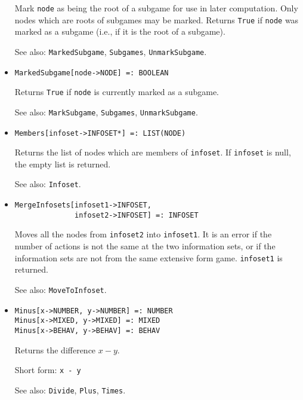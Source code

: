 \begin{itemize}
\bd
Mark \verb+node+ as being the root of a subgame for use in later computation.
Only nodes which are roots of subgames may be marked.  Returns \verb+True+
if \verb+node+ was marked as a subgame (i.e., if it is the root of a subgame).
\item [See also:] \verb+MarkedSubgame+, \verb+Subgames+,
\verb+UnmarkSubgame+.
\ed


\item{}
\protect \large \begin{verbatim}
MarkedSubgame[node->NODE] =: BOOLEAN 
\end{verbatim} \normalsize

\bd
Returns \verb+True+ if \verb+node+ is currently marked as a subgame. 
\item [See also:] \verb+MarkSubgame+, \verb+Subgames+, \verb+UnmarkSubgame+.
\ed


\item{}
\protect \large \begin{verbatim}
Members[infoset->INFOSET*] =: LIST(NODE) 
\end{verbatim}\normalsize

\bd
Returns the list of nodes which are members of \verb+infoset+.  If
\verb+infoset+ is null, the empty list is returned.
\item [See also:] \verb+Infoset+.
\ed

\item{}
\protect \large \begin{verbatim}
MergeInfosets[infoset1->INFOSET,
              infoset2->INFOSET] =: INFOSET
\end{verbatim}\normalsize

\bd
Moves all the nodes from \verb+infoset2+ into \verb+infoset1+.
It is an error if the number of actions is not the same at the
two information sets, or if the information sets are not from the
same extensive form game.  \verb+infoset1+ is returned.
\item [See also:] \verb+MoveToInfoset+.
\ed

\item 
\protect \large \begin{verbatim}
Minus[x->NUMBER, y->NUMBER] =: NUMBER 
Minus[x->MIXED, y->MIXED] =: MIXED 
Minus[x->BEHAV, y->BEHAV] =: BEHAV 
\end{verbatim} \normalsize

\bd
Returns the difference $x - y$.
\item [Short form:] \verb+x - y+
\item [See also:] \verb+Divide+, \verb+Plus+, \verb+Times+.
\ed


\end{itemize}
